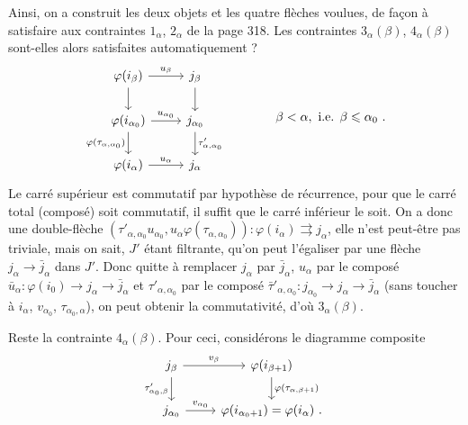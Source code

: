 Ainsi, on a construit les deux objets et les quatre flèches voulues, de façon à satisfaire aux contraintes $1_\alpha$, $2_\alpha$ de la page 318. Les contraintes $3_\alpha(\beta)$, $4_\alpha(\beta)$ sont-elles alors satisfaites automatiquement ?
\[
\begin{tikzcd}
\varphi(i_\beta) \arrow[r, "u_\beta"] \arrow[d] & j_\beta \arrow[d] \\
\varphi(i_{\alpha_0}) \arrow[r, "u_{\alpha_0}"] \arrow[d, "\varphi(\tau_{\alpha,\alpha_0})"'] & j_{\alpha_0} \arrow[d, "\tau'_{\alpha,\alpha_0}"] \\
\varphi(i_\alpha) \arrow[r, "u_\alpha"] & j_\alpha
\end{tikzcd}
\qquad\qquad \beta<\alpha, \text{ i.e. } \beta\leqslant\alpha_0\ .
\]
Le carré supérieur est commutatif par hypothèse de récurrence, pour que le carré total (composé) soit commutatif, il suffit que le carré inférieur le soit. On a donc une double-flèche $(\tau'_{\alpha,\alpha_0}u_{\alpha_0},u_\alpha\varphi(\tau_{\alpha,\alpha_0})):\varphi(i_\alpha)\rightrightarrows j_\alpha$, elle n'est peut-être pas triviale, mais on sait, $J'$ étant filtrante, qu'on peut l'égaliser par une flèche $j_\alpha\longrightarrow\bar{j}_\alpha$ dans $J'$. Donc quitte à remplacer $j_\alpha$ par %
$\bar{j}_\alpha$, $u_\alpha$ par le composé $\bar{u}_\alpha:\varphi(i_0)\longrightarrow j_\alpha\longrightarrow\bar{j}_\alpha$ et $\tau'_{\alpha,\alpha_0}$ par le composé $\bar{\tau}'_{\alpha,\alpha_0}:j_{\alpha_0}\longrightarrow j_\alpha\longrightarrow\bar{j}_\alpha$ (sans toucher à $i_\alpha$, $v_{\alpha_0}$, $\tau_{\alpha_0,\alpha}$), on peut obtenir la commutativité, d'où $3_\alpha(\beta)$. %

Reste la contrainte $4_\alpha(\beta)$. Pour ceci, considérons le diagramme composite
\[
\begin{tikzcd}
j_\beta \arrow[r, "v_\beta"] \arrow[d, "\tau'_{\alpha_0,\beta}"'] & \varphi(i_{\beta+1}) \arrow[d, "\varphi(\tau_{\alpha,\beta+1})"] \\
j_{\alpha_0} \arrow[r, "v_{\alpha_0}"] & \varphi(i_{\alpha_0+1})=\varphi(i_\alpha)\ .
\end{tikzcd}
\]

